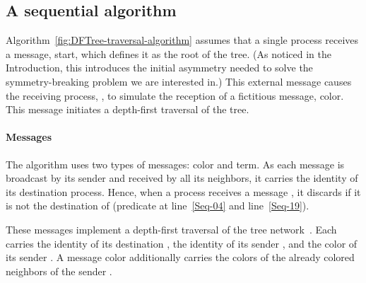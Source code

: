 \documentclass[11pt,english]{article}
\newcommand{\df}[1]{}\newcommand{\ccolor}{{\sc color}\xspace}
\begin{document}
\subsection{A  sequential algorithm}
Algorithm~\ref{fig:DFTree-traversal-algorithm} assumes that a single
process receives a message, {\sc start}, which defines it as the
root of the tree. (As noticed in the Introduction, this introduces the
initial asymmetry\df{removed 'seed' from here too} needed to solve the
symmetry-breaking problem we are interested in.)  This external
message causes the receiving process, , to simulate the reception
of a fictitious message, {\sc color}.  This
message initiates a depth-first traversal of the tree.


\paragraph{Messages}
The algorithm uses two types of messages: {\sc color} and {\sc
  term}.  As each message is broadcast by its sender and received
by all its neighbors, it carries the identity of its destination
process.  Hence, when a process receives a message , it discards
 if it is not the destination of  (predicate  at
line~\ref{Seq-04} and line~\ref{Seq-19}).

These messages implement a depth-first traversal of the tree
network~\cite{R13}. Each carries the identity of its destination
, the identity of its sender , and the color of its
sender . A message {\sc color} additionally carries
the colors of the already colored neighbors of the sender
.
\end{document}
